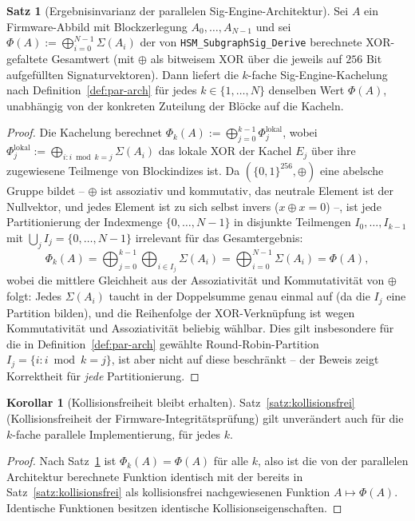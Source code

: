 ﻿\documentclass[a4paper,12pt]{article}
\theoremstyle{definition}
\newtheorem{satz}{Satz}
\newtheorem{korollar}{Korollar}
\begin{document}
\begin{satz}[Ergebnisinvarianz der parallelen Sig-Engine-Architektur]
	\label{satz:par-invarianz}
	Sei $A$ ein Firmware-Abbild mit Blockzerlegung $A_0,\ldots,A_{N-1}$ und sei $\Phi(A) := \bigoplus_{i=0}^{N-1} \Sigma(A_i)$ der von \texttt{HSM\_SubgraphSig\_Derive} berechnete XOR-gefaltete Gesamtwert (mit $\oplus$ als bitweisem XOR über die jeweils auf $256$ Bit aufgefüllten Signaturvektoren). Dann liefert die $k$-fache Sig-Engine-Kachelung nach Definition~\ref{def:par-arch} für jedes $k \in \{1,\ldots,N\}$ denselben Wert $\Phi(A)$, unabhängig von der konkreten Zuteilung der Blöcke auf die Kacheln.
\end{satz}

\begin{proof}
	Die Kachelung berechnet $\Phi_k(A) := \bigoplus_{j=0}^{k-1} \Phi_j^{\mathrm{lokal}}$, wobei $\Phi_j^{\mathrm{lokal}} := \bigoplus_{i : i \bmod k = j} \Sigma(A_i)$ das lokale XOR der Kachel $E_j$ über ihre zugewiesene Teilmenge von Blockindizes ist. Da $(\{0,1\}^{256}, \oplus)$ eine abelsche Gruppe bildet -- $\oplus$ ist assoziativ und kommutativ, das neutrale Element ist der Nullvektor, und jedes Element ist zu sich selbst invers ($x \oplus x = 0$) --, ist jede Partitionierung der Indexmenge $\{0,\ldots,N-1\}$ in disjunkte Teilmengen $I_0,\ldots,I_{k-1}$ mit $\bigcup_j I_j = \{0,\ldots,N-1\}$ irrelevant für das Gesamtergebnis:
	\[
	\Phi_k(A) = \bigoplus_{j=0}^{k-1} \bigoplus_{i \in I_j} \Sigma(A_i) = \bigoplus_{i=0}^{N-1} \Sigma(A_i) = \Phi(A),
	\]
	wobei die mittlere Gleichheit aus der Assoziativität und Kommutativität von $\oplus$ folgt: Jedes $\Sigma(A_i)$ taucht in der Doppelsumme genau einmal auf (da die $I_j$ eine Partition bilden), und die Reihenfolge der XOR-Verknüpfung ist wegen Kommutativität und Assoziativität beliebig wählbar. Dies gilt insbesondere für die in Definition~\ref{def:par-arch} gewählte Round-Robin-Partition $I_j = \{i : i \bmod k = j\}$, ist aber nicht auf diese beschränkt -- der Beweis zeigt Korrektheit für \emph{jede} Partitionierung. \qedhere
\end{proof}

\begin{korollar}[Kollisionsfreiheit bleibt erhalten]
	\label{kor:par-kollisionsfrei}
	Satz~\ref{satz:kollisionsfrei} (Kollisionsfreiheit der Firmware-Integritätsprüfung) gilt unverändert auch für die $k$-fache parallele Implementierung, für jedes $k$.
\end{korollar}

\begin{proof}
	Nach Satz~\ref{satz:par-invarianz} ist $\Phi_k(A) = \Phi(A)$ für alle $k$, also ist die von der parallelen Architektur berechnete Funktion identisch mit der bereits in Satz~\ref{satz:kollisionsfrei} als kollisionsfrei nachgewiesenen Funktion $A \mapsto \Phi(A)$. Identische Funktionen besitzen identische Kollisionseigenschaften. \qedhere
\end{proof}
\end{document}
